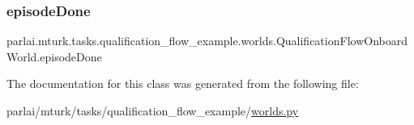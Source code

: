 \subsubsection{\texorpdfstring{episode\+Done}{episodeDone}}
{\footnotesize\ttfamily parlai.\+mturk.\+tasks.\+qualification\+\_\+flow\+\_\+example.\+worlds.\+Qualification\+Flow\+Onboard\+World.\+episode\+Done}



The documentation for this class was generated from the following file\+:\begin{DoxyCompactItemize}
\item 
parlai/mturk/tasks/qualification\+\_\+flow\+\_\+example/\hyperlink{parlai_2mturk_2tasks_2qualification__flow__example_2worlds_8py}{worlds.\+py}\end{DoxyCompactItemize}
